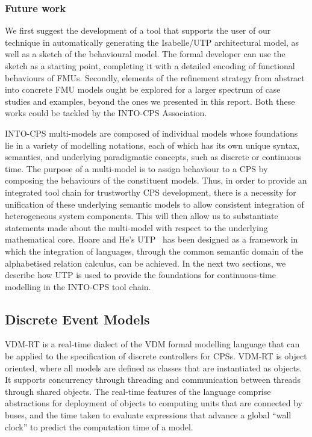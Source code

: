 \subsubsection{Future work}

We first suggest the development of a tool that supports the user of our technique in automatically generating the Isabelle/UTP architectural model, as well as a sketch of the behavioural model. The formal developer can use the sketch as a starting point, completing it with a detailed encoding of functional behaviours of FMUs. Secondly, elements of the refinement strategy from abstract into concrete FMU models ought be explored for a larger spectrum of case studies and examples, beyond the ones we presented in this report. Both these works could be tackled by the INTO-CPS Association.

INTO-CPS multi-models are composed of individual models whose foundations lie in a variety of modelling notations, each of which has its own unique syntax, semantics, and underlying paradigmatic concepts, such as discrete or continuous time.  The purpose of a multi-model is to assign behaviour to a CPS by composing the behaviours of the constituent models.  Thus, in order to provide an integrated tool chain for trustworthy CPS development, there is a necessity for unification of these underlying semantic models to allow consistent integration of heterogeneous system components.  This will then allow us to substantiate statements made about the multi-model with respect to the underlying mathematical core.  Hoare and He's UTP~\cite{Hoare&98} has been designed as a framework in which the integration of languages, through the common semantic domain of the alphabetised relation calculus, can be achieved.  In the next two sections, we describe how UTP is used to provide the foundations for continuous-time modelling in the INTO-CPS tool chain.

\subsection{Discrete Event Models}

VDM-RT is a real-time dialect of the VDM formal modelling language that can be applied to the specification of discrete controllers for CPSs.  VDM-RT is object oriented, where all models are defined as classes that are instantiated as objects.  It supports concurrency through threading and communication between threads through shared objects.  The real-time features of the language comprise abstractions for deployment of objects to computing units that are connected by buses, and the time taken to evaluate expressions that advance a global ``wall clock'' to predict the computation time of a model.

